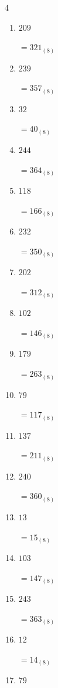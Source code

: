 \begin{multicols}{4}
\begin{enumerate}
  \item $209$

        $=321_{(8)}$

  \item $239$

        $=357_{(8)}$

  \item $32$

        $=40_{(8)}$

  \item $244$

        $=364_{(8)}$

  \item $118$

        $=166_{(8)}$

  \item $232$

        $=350_{(8)}$

  \item $202$

        $=312_{(8)}$

  \item $102$

        $=146_{(8)}$

  \item $179$

        $=263_{(8)}$

  \item $79$

        $=117_{(8)}$

  \item $137$

        $=211_{(8)}$

  \item $240$

        $=360_{(8)}$

  \item $13$

        $=15_{(8)}$

  \item $103$

        $=147_{(8)}$

\columnbreak %

  \item $243$

        $=363_{(8)}$

  \item $12$

        $=14_{(8)}$

  \item $79$


\end{enumerate}
\end{multicols}
